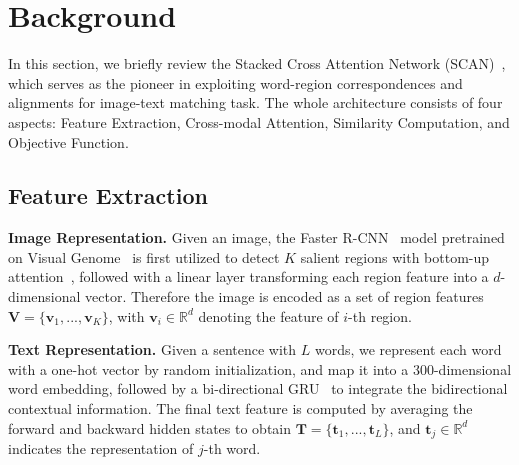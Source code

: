 \documentclass[journal]{IEEEtran}\newcommand{\ignore}[1]{}
\begin{document}
\section{Background}
In this section, we briefly review the Stacked Cross Attention Network (SCAN)~\cite{SCAN}, which serves as the pioneer in exploiting word-region correspondences and alignments for image-text matching task. The whole architecture consists of four aspects: Feature Extraction, Cross-modal Attention, Similarity Computation, and Objective Function.

\subsection{Feature Extraction}
\label{secFE}
\textbf{Image Representation.} 
Given an image, the Faster R-CNN~\cite{FasterR-CNN} model pretrained on Visual Genome~\cite{VisualGenome} is first utilized to detect $K$ salient regions with bottom-up attention~\cite{BU_TDA}, followed with a linear layer transforming each region feature into a $d$-dimensional vector. Therefore the image is encoded as a set of region features $\boldsymbol{V} = \{\boldsymbol{v}_{1},...,\boldsymbol{v}_{K}\}$, with $\boldsymbol{v}_{i}\in \mathbb{R}^{d}$ denoting the feature of $i$-th region.


\textbf{Text Representation.}
Given a sentence with $L$ words, we represent each word with a one-hot vector by random initialization, and map it into a 300-dimensional word embedding, followed by a bi-directional GRU~\cite{Bi-GRU} to integrate the bidirectional contextual information. The final text feature is computed by averaging the forward and backward hidden states to obtain $\boldsymbol{T} = \{\boldsymbol{t}_{1},...,\boldsymbol{t}_{L}\}$, and $\boldsymbol{t}_{j}\in \mathbb{R}^{d}$ indicates the representation of $j$-th word. 
\end{document}
